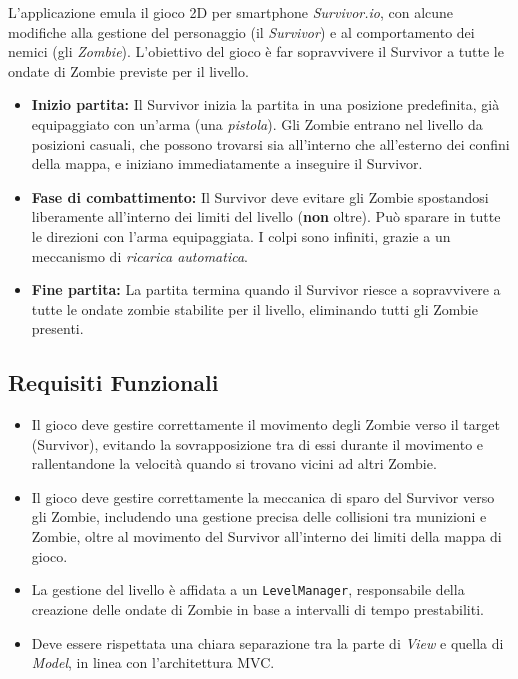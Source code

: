 \documentclass[a4paper,12pt]{report}
\begin{document}
L'applicazione emula il gioco 2D per smartphone \emph{Survivor.io}, con alcune modifiche alla gestione del personaggio (il \emph{Survivor}) e al comportamento dei nemici (gli \emph{Zombie}). L'obiettivo del gioco è far sopravvivere il Survivor a tutte le ondate di Zombie previste per il livello.

\begin{itemize}
    \item \textbf{Inizio partita:} Il Survivor inizia la partita in una posizione predefinita, già equipaggiato con un’arma (una \emph{pistola}). Gli Zombie entrano nel livello da posizioni casuali, che possono trovarsi sia all’interno che all’esterno dei confini della mappa, e iniziano immediatamente a inseguire il Survivor.

    \item \textbf{Fase di combattimento:} Il Survivor deve evitare gli Zombie spostandosi liberamente all’interno dei limiti del livello (\textbf{non} oltre). Può sparare in tutte le direzioni con l’arma equipaggiata. I colpi sono infiniti, grazie a un meccanismo di \emph{ricarica automatica}.

    \item \textbf{Fine partita:} La partita termina quando il Survivor riesce a sopravvivere a tutte le ondate zombie stabilite per il livello, eliminando tutti gli Zombie presenti.
\end{itemize}


\subsection*{Requisiti Funzionali}
\begin{itemize}
	\item Il gioco deve gestire correttamente il movimento degli Zombie verso il target (Survivor), evitando la sovrapposizione tra di essi durante il movimento e rallentandone la velocità quando si trovano vicini ad altri Zombie.
	
	\item Il gioco deve gestire correttamente la meccanica di sparo del Survivor verso gli Zombie, includendo una gestione precisa delle collisioni tra munizioni e Zombie, oltre al movimento del Survivor all'interno dei limiti della mappa di gioco.
	
	\item La gestione del livello è affidata a un \texttt{LevelManager}, responsabile della creazione delle ondate di Zombie in base a intervalli di tempo prestabiliti.
	
	\item Deve essere rispettata una chiara separazione tra la parte di \textit{View} e quella di \textit{Model}, in linea con l'architettura MVC.
\end{itemize}
\end{document}
